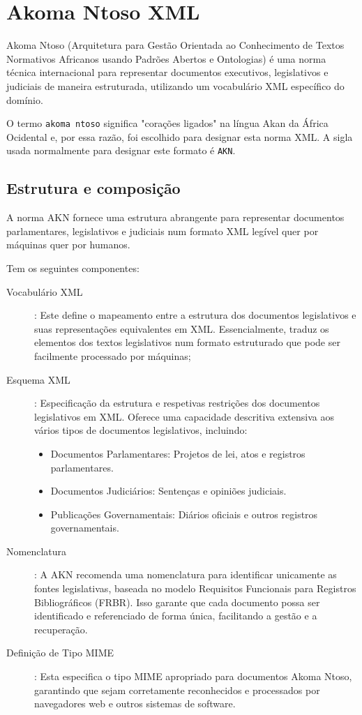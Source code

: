\section{Akoma Ntoso XML}

Akoma Ntoso (Arquitetura para Gestão Orientada ao Conhecimento de Textos Normativos Africanos usando Padrões Abertos e Ontologias) 
é uma norma técnica internacional para representar documentos executivos, legislativos e judiciais de maneira estruturada, 
utilizando um vocabulário XML específico do domínio.

O termo \texttt{akoma ntoso} significa "corações ligados" na língua Akan da África Ocidental e, por essa razão, foi escolhido 
para designar esta norma XML. A sigla usada normalmente para designar este formato é \texttt{AKN}.

\subsection{Estrutura e composição}

A norma AKN fornece uma estrutura abrangente para representar documentos parlamentares, legislativos e judiciais 
num formato XML legível quer por máquinas quer por humanos. 

Tem os seguintes componentes:

\begin{description}
\item[Vocabulário XML]: Este define o mapeamento entre a estrutura dos documentos legislativos e suas representações equivalentes 
em XML. Essencialmente, traduz os elementos dos textos legislativos num formato estruturado que pode ser facilmente processado por 
máquinas;

\item[Esquema XML]: Especificação da estrutura e respetivas restrições dos documentos legislativos em XML. 
Oferece uma capacidade descritiva extensiva aos vários tipos de documentos legislativos, incluindo:
    \begin{itemize}
        \item Documentos Parlamentares: Projetos de lei, atos e registros parlamentares.
        \item Documentos Judiciários: Sentenças e opiniões judiciais.
        \item Publicações Governamentais: Diários oficiais e outros registros governamentais.
    \end{itemize}

\item[Nomenclatura]: A AKN recomenda uma nomenclatura para identificar unicamente as fontes legislativas, 
baseada no modelo Requisitos Funcionais para Registros Bibliográficos (FRBR). 
Isso garante que cada documento possa ser identificado e referenciado de forma única, facilitando a gestão e a recuperação.

\item[Definição de Tipo MIME]: Esta especifica o tipo MIME apropriado para documentos Akoma Ntoso, garantindo que sejam corretamente reconhecidos e processados por navegadores web e outros sistemas de software.

\end{description}

